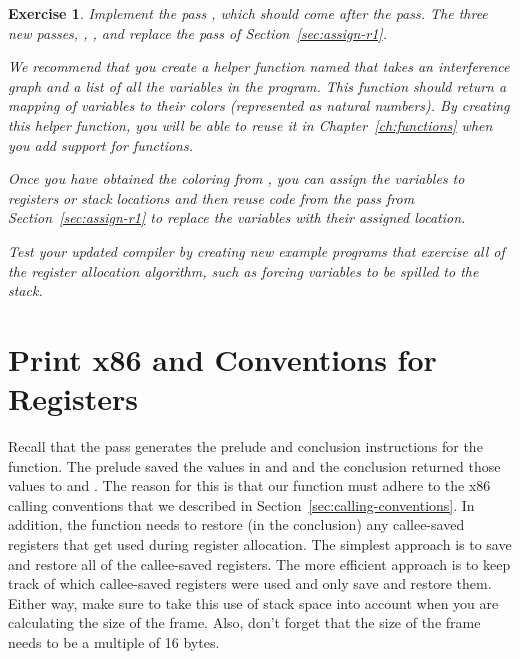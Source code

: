 \documentclass[11pt]{book}
\newtheorem{exercise}[theorem]{Exercise}
\begin{document}
\begin{exercise}\normalfont
  Implement the pass , which should come
  after the  pass. The three new passes,
  , , and
   replace the  pass of
  Section~\ref{sec:assign-r1}.
  
  We recommend that you create a helper function named
   that takes an interference graph and a list of
  all the variables in the program. This function should return a
  mapping of variables to their colors (represented as natural
  numbers). By creating this helper function, you will be able to
  reuse it in Chapter~\ref{ch:functions} when you add support for
  functions.

  Once you have obtained the coloring from , you can
  assign the variables to registers or stack locations and then reuse
  code from the  pass from
  Section~\ref{sec:assign-r1} to replace the variables with their
  assigned location.
  
  Test your updated compiler by creating new example programs that
  exercise all of the register allocation algorithm, such as forcing
  variables to be spilled to the stack.
\end{exercise}


\section{Print x86 and Conventions for Registers}
\label{sec:print-x86-reg-alloc}

Recall that the  pass generates the prelude and
conclusion instructions for the  function.
%
The prelude saved the values in  and  and the
conclusion returned those values to  and .  The
reason for this is that our  function must adhere to the
x86 calling conventions that we described in
Section~\ref{sec:calling-conventions}. In addition, the 
function needs to restore (in the conclusion) any callee-saved
registers that get used during register allocation. The simplest
approach is to save and restore all of the callee-saved registers. The
more efficient approach is to keep track of which callee-saved
registers were used and only save and restore them. Either way, make
sure to take this use of stack space into account when you are
calculating the size of the frame. Also, don't forget that the size of
the frame needs to be a multiple of 16 bytes.
\end{document}
